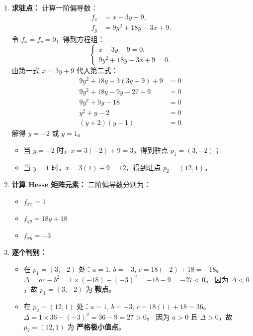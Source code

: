 \documentclass[lang=cn,11pt]{elegantbook}
\begin{document}
\begin{solution}
\begin{enumerate}
  \item \textbf{求驻点：}
  计算一阶偏导数：
  \begin{align*}
  f_x &= x-3y-9, \\
  f_y &= 9y^2+18y-3x+9.
  \end{align*}
  令 $f_x=f_y=0$，得到方程组：
  \[
  \begin{cases}
  x-3y-9=0,\\
  9y^2+18y-3x+9=0.
  \end{cases}
  \]
  由第一式 $x=3y+9$ 代入第二式：
  \begin{align*}
  9y^2+18y-3(3y+9)+9 &= 0 \\
  9y^2+18y-9y-27+9 &= 0 \\
  9y^2+9y-18 &= 0 \\
  y^2+y-2 &= 0 \\
  (y+2)(y-1) &= 0.
  \end{align*}
  解得 $y=-2$ 或 $y=1$。
  \begin{itemize}
    \item 当 $y=-2$ 时，$x=3(-2)+9=3$，得到驻点 $p_1=(3,-2)$；
    \item 当 $y=1$ 时，$x=3(1)+9=12$，得到驻点 $p_2=(12,1)$。
  \end{itemize}

  \item \textbf{计算 Hesse 矩阵元素：}
  二阶偏导数分别为：
  \begin{itemize}
    \item $f_{xx}=1$
    \item $f_{yy}=18y+18$
    \item $f_{xy}=-3$
  \end{itemize}

  \item \textbf{逐个判别：}
  \begin{itemize}
    \item 在 $p_1=(3,-2)$ 处：$a=1$, $b=-3$, $c=18(-2)+18=-18$。
          $\Delta=ac-b^2=1\times(-18)-(-3)^2=-18-9=-27<0$。
          因为 $\Delta<0$，故 $p_1=(3,-2)$ 为 \textbf{鞍点}。
    \item 在 $p_2=(12,1)$ 处：$a=1$, $b=-3$, $c=18(1)+18=36$。
          $\Delta=1\times36-(-3)^2=36-9=27>0$。
          因为 $a>0$ 且 $\Delta>0$，故 $p_2=(12,1)$ 为 \textbf{严格极小值点}。
  \end{itemize}
\end{enumerate}
\end{solution}
\end{document}

